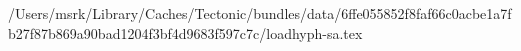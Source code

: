 /Users/msrk/Library/Caches/Tectonic/bundles/data/6ffe055852f8faf66c0acbe1a7fb27f87b869a90bad1204f3bf4d9683f597c7c/loadhyph-sa.tex
